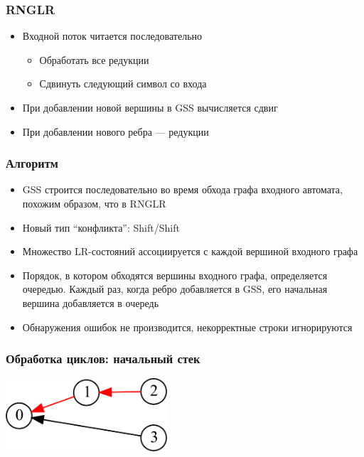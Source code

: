\documentclass{beamer}
\begin{document}
\begin{frame}
  \transwipe[direction=90]
  \frametitle{RNGLR}
  \begin{itemize}
    \item Входной поток читается последовательно
    \begin{itemize}
      \item Обработать все редукции
      \item Сдвинуть следующий символ со входа
    \end{itemize}
  \end{itemize}
  \begin{itemize}
    \item При добавлении новой вершины в GSS вычисляется сдвиг
    \item При добавлении нового ребра --- редукции
  \end{itemize}
\end{frame}



\begin{frame}
  \transwipe[direction=90]
  \frametitle{Алгоритм}
  \begin{itemize}
    \item GSS строится последовательно во время обхода графа входного автомата, 
похожим образом, что в RNGLR
    \item Новый тип ``конфликта'': Shift/Shift
  \end{itemize}
  \begin{itemize}
    \item Множество LR-состояний ассоциируется с каждой вершиной входного графа
    \item Порядок, в котором обходятся вершины входного графа, определяется 
очередью. Каждый раз, когда ребро добавляется в GSS, его начальная вершина 
добавляется в очередь
  \end{itemize}
  \begin{itemize}
    \item Обнаружения ошибок не производится, некорректные строки игнорируются
  \end{itemize}
\end{frame}

\begin{frame}
  \transwipe[direction=90]
  \frametitle{Обработка циклов: начальный стек}
  \begin{center}                                
  \includegraphics[width=6cm]{pictures/gss_cycle/gss_cycle_init_highlight}
  \end{center}
\end{frame}
\end{document}
